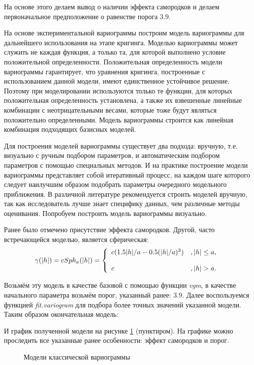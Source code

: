 На основе этого делаем вывод о наличии эффекта самородков и делаем первоначальное предположение о равенстве порога $3.9$.

На основе экспериментальной вариограммы построим модель вариограммы для дальнейшего использования на этапе кригинга. Моделью вариограммы может служить не каждая функция, а только та, для которой выполнено условие положительной определенности. Положительная определенность модели вариограммы гарантирует, что уравнения кригинга, построенные с использованием данной модели, имеют единственное устойчивое решение. Поэтому при моделировании используются только те функции, для которых положительная определенность установлена, а также их взвешенные линейные комбинации с неотрицательными весами, которые тоже будут являться положительно определенными. Модель вариограммы строится как линейная комбинация подходящих базисных моделей.

Для построения моделей вариограммы существует два подхода: вручную, т.е. визуально с ручным подбором параметров, и автоматическим подбором параметров с помощью специальных методов. И на практике построение модели вариограммы  представляет собой итеративный процесс, на каждом шаге которого следует наилучшим образом подобрать параметры очередного модельного приближения. В различной литературе рекомендуется строить моделей вручную, так как исследователь лучше знает специфику данных, чем различные методы оценивания. Попробуем построить модель вариограммы визуально.

Ранее было отмечено присутствие эффекта самородков. Другой, часто встречающейся моделью, является сферическая: 
\begin{equation}
	\gamma(\vert h \vert) = c Sph_a(\vert h \vert) = \left\{
 \begin{array}{l l}
   c(1.5 \vert h \vert / a - 0.5(\vert h \vert / a)^3) &, \vert h \vert \le a, \\
   \\
   c &,	 \vert h \vert > a.
 \end{array} \right.	
\end{equation}

Возьмём эту модель в качестве базовой с помощью функции \textit{vgm}, в качестве начального параметра возьмём порог, указанный ранее: $3.9$. Далее воспользуемся функцией \textit{fit.variogram} для подбора более точных значений указанной модели. Таким образом окончательная модель:

И график полученной модели на рисунке \ref{img:var-models} (пунктиром). На графике можно проследить все указанные ранее особенности: эффект самородков и порог.
\begin{figure}[ht]
\caption{Модели классической вариограммы}
\label{img:var-models}
\end{figure}

